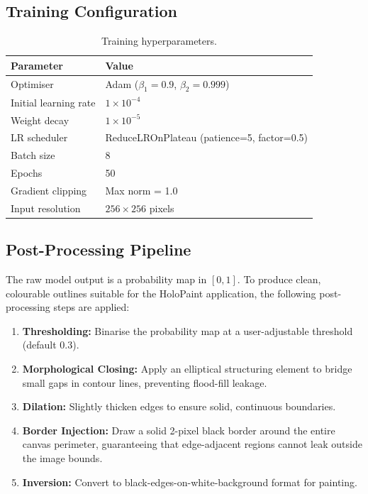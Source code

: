 \documentclass[12pt, a4paper]{article}
\begin{document}
\subsection{Training Configuration}

\begin{table}[H]
    \centering
    \caption{Training hyperparameters.}
    \label{tab:training}
    \begin{tabular}{ll}
        \toprule
        \textbf{Parameter} & \textbf{Value} \\
        \midrule
        Optimiser                  & Adam ($\beta_1=0.9$, $\beta_2=0.999$) \\
        Initial learning rate      & $1 \times 10^{-4}$ \\
        Weight decay               & $1 \times 10^{-5}$ \\
        LR scheduler               & ReduceLROnPlateau (patience=5, factor=0.5) \\
        Batch size                 & 8 \\
        Epochs                     & 50 \\
        Gradient clipping          & Max norm = 1.0 \\
        Input resolution           & $256 \times 256$ pixels \\
        \bottomrule
    \end{tabular}
\end{table}

\subsection{Post-Processing Pipeline}

The raw model output is a probability map in $[0, 1]$.
To produce clean, colourable outlines suitable for the HoloPaint application, the following post-processing steps are applied:

\begin{enumerate}[nosep]
    \item \textbf{Thresholding:} Binarise the probability map at a user-adjustable threshold (default 0.3).
    \item \textbf{Morphological Closing:} Apply an elliptical structuring element to bridge small gaps in contour lines, preventing flood-fill leakage.
    \item \textbf{Dilation:} Slightly thicken edges to ensure solid, continuous boundaries.
    \item \textbf{Border Injection:} Draw a solid 2-pixel black border around the entire canvas perimeter, guaranteeing that edge-adjacent regions cannot leak outside the image bounds.
    \item \textbf{Inversion:} Convert to black-edges-on-white-background format for painting.
\end{enumerate}
\end{document}
